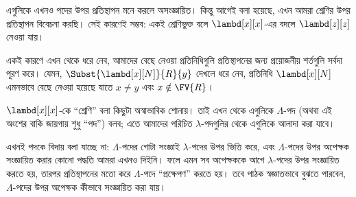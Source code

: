 \documentclass[../../../include/open-logic-section]{subfiles}
\begin{document}
এগুলিকে এখনও পদের উপর প্রতিস্থাপন মনে করলে 
অসংজ্ঞায়িত। কিন্তু আগেই বলা হয়েছে, এখন আমরা শ্রেণির উপর প্রতিস্থাপন
বিবেচনা করছি। সেই কারণেই  সম্ভব: একই শ্রেণিভুক্ত বলে
$\lambd[x][x]$-এর বদলে $\lambd[z][z]$ নেওয়া যায়।

একই কারণে এখন থেকে ধরে নেব, আমাদের বেছে নেওয়া প্রতিনিধিগুলি
প্রতিস্থাপনের জন্য প্রয়োজনীয় শর্তগুলি সর্বদা পূরণ করে। যেমন,
$\Subst{\lambd[x][N]}{R}{y}$ দেখলে ধরে নেব, প্রতিনিধি
$\lambd[x][N]$ এমনভাবে বেছে নেওয়া হয়েছে যাতে $x \neq y$ এবং
$x \notin \FV{R}$।

$\lambd[x][x]$-কে “শ্রেণি” বলা কিছুটা অস্বাভাবিক শোনায়। তাই এখন
থেকে এগুলিকে $\Lambda$-পদ (অথবা এই অংশের বাকি জায়গায় শুধু “পদ”)
বলব; এতে আমাদের পরিচিত $\lambda$-পদগুলির থেকে এগুলিকে আলাদা করা যাবে।

\begin{editorial}
  এখনই পদকে বিদায় বলা যাচ্ছে না: $\Lambda$-পদের গোটা সংজ্ঞাই
  $\lambda$-পদের উপর ভিত্তি করে, এবং $\Lambda$-পদের উপর অপেক্ষক
  সংজ্ঞায়িত করার কোনো পদ্ধতি আমরা এখনও দিইনি। ফলে এমন সব অপেক্ষককে
  আগে $\lambda$-পদের উপর সংজ্ঞায়িত করতে হয়, তারপর প্রতিস্থাপনের মতো
  করে $\Lambda$-পদে “প্রক্ষেপণ” করতে হয়। তবে পাঠক স্বজ্ঞাতভাবে বুঝতে
  পারবেন, $\Lambda$-পদের উপর অপেক্ষক কীভাবে সংজ্ঞায়িত করা যায়।
\end{editorial}
\end{document}
